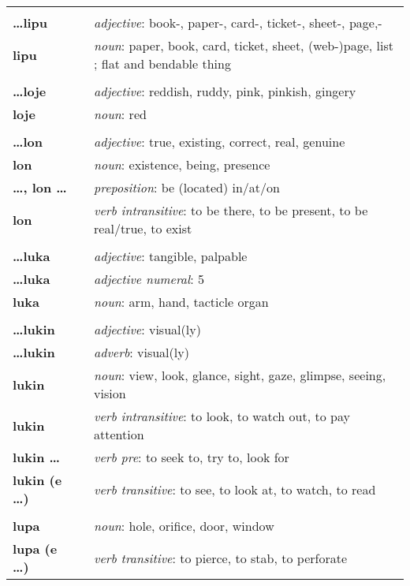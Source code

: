 \begin{supertabular}{p{2,5cm}|ll}
 && \\ %
\textbf{\dots lipu} && \textit{adjective}: book-, paper-, card-, ticket-, sheet-, page,- \\ 
\textbf{lipu} && \textit{noun}: paper, book, card, ticket, sheet, (web-)page, list ; flat and bendable thing \\ 
 && \\ %
\textbf{\dots loje} && \textit{adjective}: reddish, ruddy, pink, pinkish, gingery \\ 
\textbf{loje} && \textit{noun}: red \\ 
 && \\ %
\textbf{\dots lon} && \textit{adjective}: true, existing, correct, real, genuine \\ 
\textbf{lon} && \textit{noun}: existence, being, presence \\ 
\textbf{\dots , lon \dots} && \textit{preposition}: be (located) in/at/on \\ 
\textbf{lon} && \textit{verb intransitive}: to be there, to be present, to be real/true, to exist \\ 
 && \\ %
\textbf{\dots luka} && \textit{adjective}: tangible, palpable \\ 
\textbf{\dots luka} && \textit{adjective numeral}: 5 \\ 
\textbf{luka} && \textit{noun}: arm, hand, tacticle organ \\ 
 && \\ %
\textbf{\dots lukin} && \textit{adjective}: visual(ly) \\ 
\textbf{\dots lukin} && \textit{adverb}: visual(ly) \\ 
\textbf{lukin} && \textit{noun}: view, look, glance, sight, gaze, glimpse, seeing, vision \\ 
\textbf{lukin} && \textit{verb intransitive}: to look, to watch out, to pay attention \\ 
\textbf{lukin \dots} && \textit{verb pre}: to seek to, try to, look for \\ 
\textbf{lukin (e \dots)} && \textit{verb transitive}: to see, to look at, to watch, to read \\ 
 && \\ %
\textbf{lupa} && \textit{noun}: hole, orifice, door, window \\ 
\textbf{lupa (e \dots)} && \textit{verb transitive}: to pierce, to stab, to perforate \\ 

\end{supertabular}
